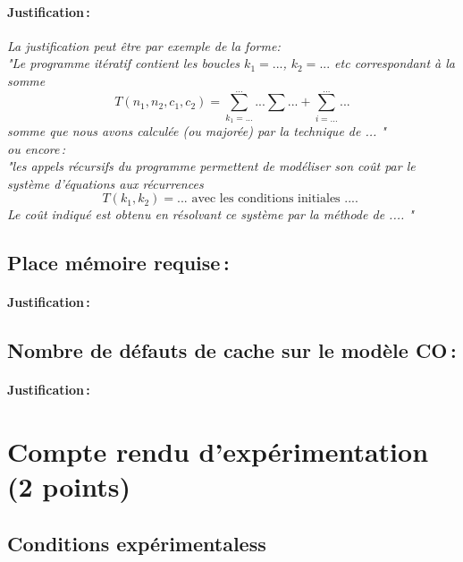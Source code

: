 \documentclass[a4paper, 10pt, french]{article}
\begin{document}
    \paragraph{Justification\,: }
    {\em La justification peut être par exemple de la forme: \\ 
       "Le programme itératif contient les boucles $k_1=...$, $k_2= ...$ etc correspondant à la somme 
      $$T(n_1, n_2, c_1, c_2) = \sum_{k_1=...}^{...} ... \sum ... + \sum_{i=...}^{...} ...$$ 
      somme que nous avons calculée (ou majorée) par la technique de  ... " \\
      ou  encore\,:  \\
      "les appels récursifs du programme permettent de modéliser son coût par le système d'équations aux récurrences 
      $$T(k_1, k_2) = ...  \mbox{~avec~les~conditions~initiales~....~} $$
      Le coût indiqué est obtenu en résolvant ce système par la méthode de  .... "
    } 
  \subsection{Place mémoire requise\,: }
    \paragraph{Justification\,: }

  \subsection{Nombre de défauts de cache sur le modèle CO\,: }
    \paragraph{Justification\,: }


\section{Compte rendu d'expérimentation (2 points)}
  \subsection{Conditions expérimentaless}
\end{document}
